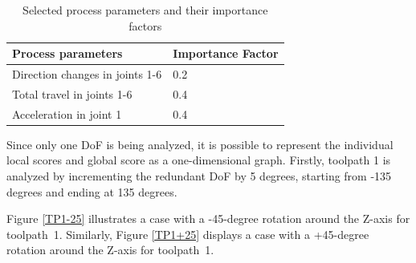 \begin{table}[H]
	\centering
	\begin{tabular}{||l|l||}
		Process parameters& Importance Factor \\
		\hline
		\hline
		\hline
		Direction changes in joints 1-6	&		0.2 \\
		Total travel in joints 1-6	&  	0.4 \\
		Acceleration in joint 1	& 		0.4\\
		
		\hline
		\hline
	\end{tabular}
	
	\caption{Selected process parameters and their importance factors}
	\label{PPbasic}
\end{table}


Since only one \acrshort{DoF} is being analyzed, it is possible to represent the individual local scores and global score as a one-dimensional graph. Firstly, toolpath 1 is analyzed by incrementing the redundant \acrshort{DoF} by 5 degrees, starting from -135 degrees and ending at 135 degrees.

Figure \ref{TP1-25} illustrates a case with a -45-degree rotation around the Z-axis for toolpath~1.
Similarly, Figure \ref{TP1+25} displays a case with a +45-degree rotation around the Z-axis for toolpath~1.

